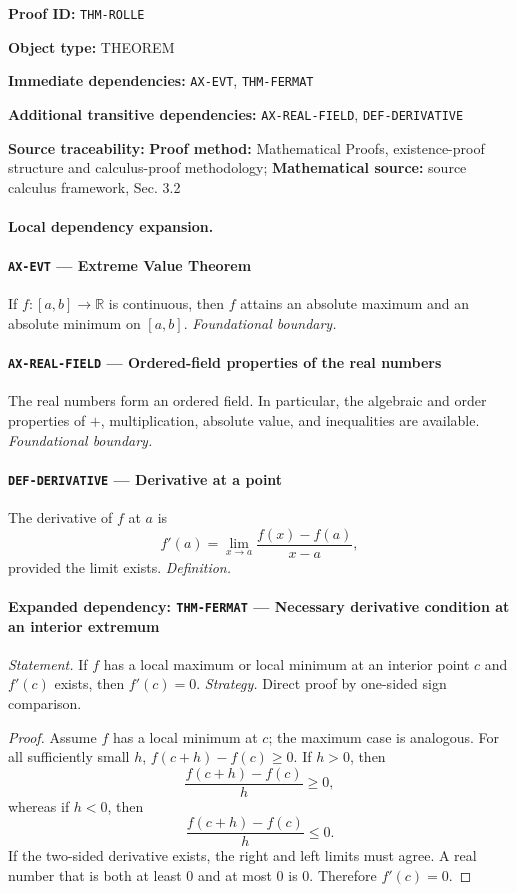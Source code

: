 \documentclass[10pt]{article}
\newcommand{\pidraw}[1]{\begingroup\urlstyle{tt}\nolinkurl{#1}\endgroup}
\theoremstyle{definition}
\theoremstyle{remark}
\newcommand{\meta}[2]{\noindent\textbf{#1:} #2\par}
\begin{document}
\meta{Proof ID}{\pidraw{THM-ROLLE}}
\meta{Object type}{THEOREM}
\meta{Immediate dependencies}{\pidraw{AX-EVT}, \pidraw{THM-FERMAT}}
\meta{Additional transitive dependencies}{\pidraw{AX-REAL-FIELD}, \pidraw{DEF-DERIVATIVE}}
\meta{Source traceability}{\textbf{Proof method:} Mathematical Proofs, existence-proof structure and calculus-proof methodology; \textbf{Mathematical source:} source calculus framework, Sec. 3.2}

\paragraph{Local dependency expansion.}

\paragraph{\pidraw{AX-EVT} --- Extreme Value Theorem}
If $f:[a,b]\to\mathbb{R}$ is continuous, then $f$ attains an absolute maximum and an absolute minimum on $[a,b]$.
\textit{Foundational boundary.}

\paragraph{\pidraw{AX-REAL-FIELD} --- Ordered-field properties of the real numbers}
The real numbers form an ordered field. In particular, the algebraic and order properties of $+$, multiplication, absolute value, and inequalities are available.
\textit{Foundational boundary.}

\paragraph{\pidraw{DEF-DERIVATIVE} --- Derivative at a point}
The derivative of $f$ at $a$ is
\[
f'(a)=\lim_{x\to a}\frac{f(x)-f(a)}{x-a},
\]
provided the limit exists.
\textit{Definition.}

\paragraph{Expanded dependency: \pidraw{THM-FERMAT} --- Necessary derivative condition at an interior extremum}
\textit{Statement.} If $f$ has a local maximum or local minimum at an interior point $c$ and $f'(c)$ exists, then $f'(c)=0$.
\textit{Strategy.} Direct proof by one-sided sign comparison.
\begin{proof}Assume $f$ has a local minimum at $c$; the maximum case is analogous.
For all sufficiently small $h$,
$f(c+h)-f(c)\ge0$. If $h>0$, then
\[
\frac{f(c+h)-f(c)}{h}\ge0,
\]
whereas if $h<0$, then
\[
\frac{f(c+h)-f(c)}{h}\le0.
\]
If the two-sided derivative exists, the right and left limits must agree.
A real number that is both at least $0$ and at most $0$ is $0$.
Therefore $f'(c)=0$.\end{proof}
\end{document}
